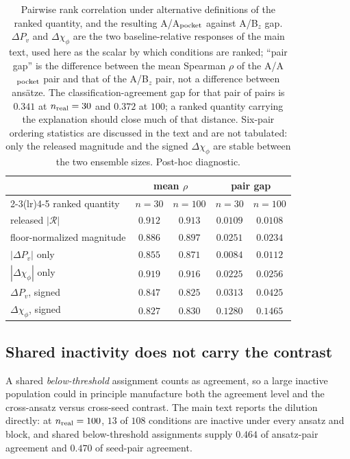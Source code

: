 \documentclass[aip,jap,reprint,onecolumn,superscriptaddress,longbibliography]{revtex4-2}
\begin{document}
\begin{table}[t]
\centering
\caption{Pairwise rank correlation under alternative definitions of the ranked
quantity, and the resulting A/A$_{\rm pocket}$ against A/B$_z$ gap.
$\Delta P_v$ and $\Delta\chi_\phi$ are the two baseline-relative responses of
the main text, used here as the scalar by which conditions are ranked;
``pair gap'' is the difference between the mean Spearman $\rho$ of the
A/A$_{\rm pocket}$ pair and that of the A/B$_z$ pair, not a difference between
ans\"atze. The
classification-agreement gap for that pair of pairs is $0.341$ at
$n_{\rm real}=30$ and $0.372$ at $100$; a ranked quantity carrying the
explanation should close much of that distance. Six-pair ordering statistics are discussed in the
text and are not tabulated: only the released magnitude and the signed
$\Delta\chi_\phi$ are stable between the two ensemble sizes. Post-hoc
diagnostic.}
\label{tab:weight}
\small
\begin{tabular}{lcccc}
\toprule
 & \multicolumn{2}{c}{mean $\rho$} & \multicolumn{2}{c}{pair gap} \\
\cmidrule(lr){2-3}\cmidrule(lr){4-5}
ranked quantity & $n{=}30$ & $n{=}100$ & $n{=}30$ & $n{=}100$ \\
\midrule
released $|\mathcal{R}|$ & $0.912$ & $0.913$ & $0.0109$ & $0.0108$ \\
floor-normalized magnitude & $0.886$ & $0.897$ & $0.0251$ & $0.0234$ \\
$|\Delta P_v|$ only & $0.855$ & $0.871$ & $0.0084$ & $0.0112$ \\
$|\Delta\chi_\phi|$ only & $0.919$ & $0.916$ & $0.0225$ & $0.0256$ \\
$\Delta P_v$, signed & $0.847$ & $0.825$ & $0.0313$ & $0.0425$ \\
$\Delta\chi_\phi$, signed & $0.827$ & $0.830$ & $\mathbf{0.1280}$ & $\mathbf{0.1465}$ \\
\bottomrule
\end{tabular}
\end{table}

\subsection{Shared inactivity does not carry the contrast}
A shared \emph{below-threshold} assignment counts as agreement, so a large
inactive population could in principle manufacture both the agreement level and
the cross-ansatz versus cross-seed contrast. The main text reports the dilution
directly: at $n_{\rm real}=100$, $13$ of $108$ conditions are inactive under
every ansatz and block, and shared below-threshold assignments supply $0.464$
of ansatz-pair agreement and $0.470$ of seed-pair agreement.
\end{document}
